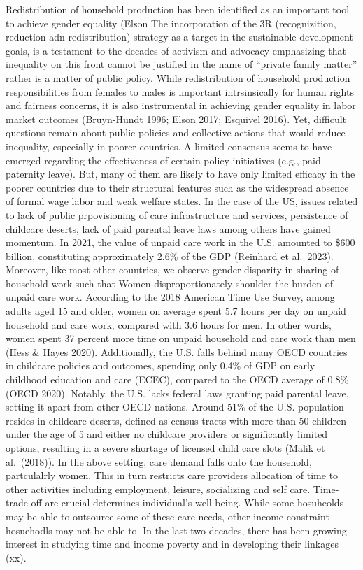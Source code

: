 \documentclass[
  11pt,
]{article}
\begin{document}
Redistribution of household production has been identified as an
important tool to achieve gender equality (Elson The incorporation of
the 3R (recognizition, reduction adn redistribution) strategy as a
target in the sustainable development goals, is a testament to the
decades of activism and advocacy emphasizing that inequality on this
front cannot be justified in the name of ``private family matter''
rather is a matter of public policy. While redistribution of household
production responsibilities from females to males is important
intrsinsically for human rights and fairness concerns, it is also
instrumental in achieving gender equality in labor market outcomes
(Bruyn-Hundt 1996; Elson 2017; Esquivel 2016). Yet, difficult questions
remain about public policies and collective actions that would reduce
inequality, especially in poorer countries. A limited consensus seems to
have emerged regarding the effectiveness of certain policy initiatives
(e.g., paid paternity leave). But, many of them are likely to have only
limited efficacy in the poorer countries due to their structural
features such as the widespread absence of formal wage labor and weak
welfare states. In the case of the US, issues related to lack of public
prpovisioning of care infrastructure and services, persistence of
childcare deserts, lack of paid parental leave laws among others have
gained momentum. In 2021, the value of unpaid care work in the U.S.
amounted to \$600 billion, constituting approximately 2.6\% of the GDP
(Reinhard et al.~2023). Moreover, like most other countries, we observe
gender disparity in sharing of household work such that Women
disproportionately shoulder the burden of unpaid care work. According to
the 2018 American Time Use Survey, among adults aged 15 and older, women
on average spent 5.7 hours per day on unpaid household and care work,
compared with 3.6 hours for men. In other words, women spent 37 percent
more time on unpaid household and care work than men (Hess \& Hayes
2020). Additionally, the U.S. falls behind many OECD countries in
childcare policies and outcomes, spending only 0.4\% of GDP on early
childhood education and care (ECEC), compared to the OECD average of
0.8\% (OECD 2020). Notably, the U.S. lacks federal laws granting paid
parental leave, setting it apart from other OECD nations. Around 51\% of
the U.S. population resides in childcare deserts, defined as census
tracts with more than 50 children under the age of 5 and either no
childcare providers or significantly limited options, resulting in a
severe shortage of licensed child care slots (Malik et al.~(2018)). In
the above setting, care demand falls onto the household, partculalrly
women. This in turn restricts care providers allocation of time to other
activities including employment, leisure, socializing and self care.
Time-trade off are crucial determines individual's well-being. While
some hosuheolds may be able to outsource some of these care needs, other
income-constraint hosuehodls may not be able to. In the last two
decades, there has been growing interest in studying time and income
poverty and in developing their linkages (xx).
\end{document}
